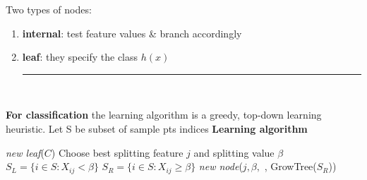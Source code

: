 \documentclass[10pt,landscape]{article}
\newcommand{\ruler}{\\\rule{\columnwidth}{0.25pt}\\}
\begin{document}
\begin{multicols*}{3}
    Two types of nodes:
    \begin{enumerate}
        \item \textbf{internal}: test feature values \& branch accordingly
        \item \textbf{leaf}: they specify the class \( h(x) \)
              \ruler
    \end{enumerate}
    \textbf{For classification} the learning algorithm is a greedy, top-down learning heuristic. Let S be subset of sample pts indices
    \textbf{Learning algorithm}\\

    \begin{algorithmic}
        \State \Return \textit{new leaf}($C$)
        \Else
        \State Choose best splitting feature $j$ and splitting value $\beta$
        \State $S_L = \{ i \in S: X_{ij} < \beta \}$
        \State $S_R = \{ i \in S: X_{ij} \ge \beta \}$
        \State \Return \textit{new node}($j, \beta,$ , GrowTree($S_R$))
        \EndIf
        \EndFunction
    \end{algorithmic}
\end{multicols*}
\end{document}
